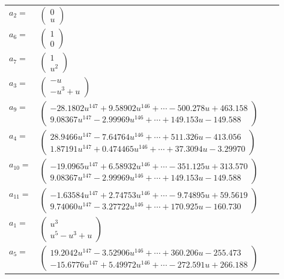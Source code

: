 \documentclass[1p]{elsarticle_modified}
\theoremstyle{definition}
\begin{document}
\begin{tabular}{m{7pt} m{180pt} m{7pt} m{180pt} }
\flushright $a_{2}=$&$\begin{pmatrix}0\\u\end{pmatrix}$ \\
\flushright $a_{6}=$&$\begin{pmatrix}1\\0\end{pmatrix}$ \\
\flushright $a_{7}=$&$\begin{pmatrix}1\\u^2\end{pmatrix}$ \\
\flushright $a_{3}=$&$\begin{pmatrix}- u\\- u^3+u\end{pmatrix}$ \\
\flushright $a_{9}=$&$\begin{pmatrix}-28.1802 u^{147}+9.58902 u^{146}+\cdots-500.278 u+463.158\\9.08367 u^{147}-2.99969 u^{146}+\cdots+149.153 u-149.588\end{pmatrix}$ \\
\flushright $a_{4}=$&$\begin{pmatrix}28.9466 u^{147}-7.64764 u^{146}+\cdots+511.326 u-413.056\\1.87191 u^{147}+0.474465 u^{146}+\cdots+37.3094 u-3.29970\end{pmatrix}$ \\
\flushright $a_{10}=$&$\begin{pmatrix}-19.0965 u^{147}+6.58932 u^{146}+\cdots-351.125 u+313.570\\9.08367 u^{147}-2.99969 u^{146}+\cdots+149.153 u-149.588\end{pmatrix}$ \\
\flushright $a_{11}=$&$\begin{pmatrix}-1.63584 u^{147}+2.74753 u^{146}+\cdots-9.74895 u+59.5619\\9.74060 u^{147}-3.27722 u^{146}+\cdots+170.925 u-160.730\end{pmatrix}$ \\
\flushright $a_{1}=$&$\begin{pmatrix}u^3\\u^5- u^3+u\end{pmatrix}$ \\
\flushright $a_{5}=$&$\begin{pmatrix}19.2042 u^{147}-3.52906 u^{146}+\cdots+360.206 u-255.473\\-15.6776 u^{147}+5.49972 u^{146}+\cdots-272.591 u+266.188\end{pmatrix}$ \\

\end{tabular}
\end{document}
